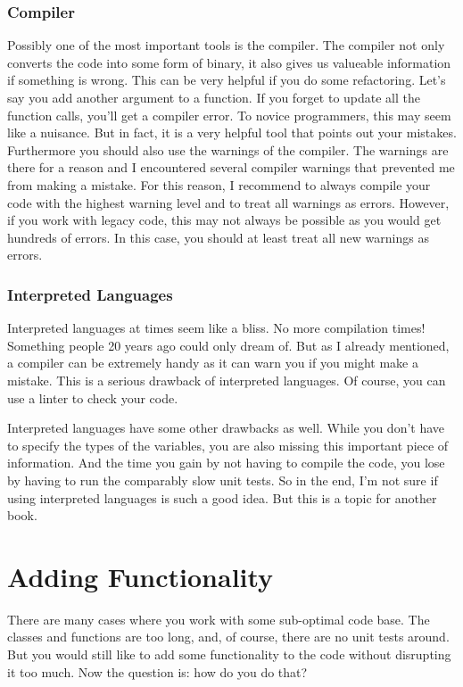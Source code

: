 \subsection{Compiler}

Possibly one of the most important tools is the compiler. The compiler not only converts the code into some form of binary, it also gives us valueable information if something is wrong. This can be very helpful if you do some refactoring. Let's say you add another argument to a function. If you forget to update all the function calls, you'll get a compiler error. To novice programmers, this may seem like a nuisance. But in fact, it is a very helpful tool that points out your mistakes. Furthermore you should also use the warnings of the compiler. The warnings are there for a reason and I encountered several compiler warnings that prevented me from making a mistake. For this reason, I recommend to always compile your code with the highest warning level and to treat all warnings as errors. However, if you work with legacy code, this may not always be possible as you would get hundreds of errors. In this case, you should at least treat all new warnings as errors.

\subsection{Interpreted Languages}

Interpreted languages at times seem like a bliss. No more compilation times! Something people 20 years ago could only dream of. But as I already mentioned, a compiler can be extremely handy as it can warn you if you might make a mistake. This is a serious drawback of interpreted languages. Of course, you can use a linter to check your code.

Interpreted languages have some other drawbacks as well. While you don't have to specify the types of the variables, you are also missing this important piece of information. And the time you gain by not having to compile the code, you lose by having to run the comparably slow unit tests. So in the end, I'm not sure if using interpreted languages is such a good idea. But this is a topic for another book.


\chapter{Adding Functionality}

There are many cases where you work with some sub-optimal code base. The classes and functions are too long, and, of course, there are no unit tests around. But you would still like to add some functionality to the code without disrupting it too much. Now the question is: how do you do that?

